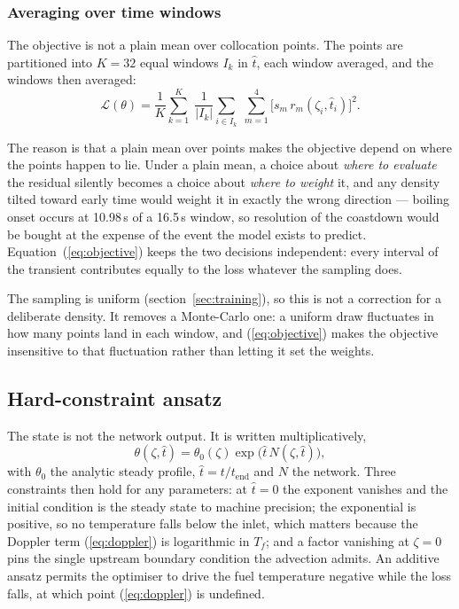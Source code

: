 \documentclass[11pt,a4paper]{article}
\begin{document}
\subsubsection{Averaging over time windows}

The objective is not a plain mean over collocation points. The points are partitioned into
$K = 32$ equal windows $I_k$ in $\hat{t}$, each window averaged, and the windows then
averaged:
\begin{equation}\label{eq:objective}
\mathcal{L}(\theta) = \frac{1}{K}\sum_{k=1}^{K}\;
  \frac{1}{|I_k|}\sum_{i \in I_k}\; \sum_{m=1}^{4}
  \bigl[s_m\,r_m(\zeta_i,\hat{t}_i)\bigr]^2 .
\end{equation}

The reason is that a plain mean over points makes the objective depend on where the points
happen to lie. Under a plain mean, a choice about \emph{where to evaluate} the residual
silently becomes a choice about \emph{where to weight} it, and any density tilted toward
early time would weight it in exactly the wrong direction --- boiling onset occurs at
10.98\,s of a 16.5\,s window, so resolution of the coastdown would be bought at the expense
of the event the model exists to predict. Equation~(\ref{eq:objective}) keeps the two
decisions independent: every interval of the transient contributes equally to the loss
whatever the sampling does.

The sampling is uniform (section~\ref{sec:training}), so this is not a correction for a
deliberate density. It removes a Monte-Carlo one: a uniform draw fluctuates in how many
points land in each window, and (\ref{eq:objective}) makes the objective insensitive to
that fluctuation rather than letting it set the weights.

\subsection{Hard-constraint ansatz}\label{sec:ansatz}

The state is not the network output. It is written multiplicatively,
\begin{equation}\label{eq:ansatz}
\theta(\zeta,\hat{t}) = \theta_0(\zeta)\exp\bigl(\hat{t}\,N(\zeta,\hat{t})\bigr),
\end{equation}
with $\theta_0$ the analytic steady profile, $\hat{t} = t/t_{\mathrm{end}}$ and $N$ the
network. Three constraints then hold for any parameters: at $\hat{t} = 0$ the exponent
vanishes and the initial condition is the steady state to machine precision; the
exponential is positive, so no temperature falls below the inlet, which matters because the
Doppler term (\ref{eq:doppler}) is logarithmic in $T_f$; and a factor vanishing at
$\zeta = 0$ pins the single upstream boundary condition the advection admits. An additive
ansatz permits the optimiser to drive the fuel temperature negative while the loss falls,
at which point (\ref{eq:doppler}) is undefined.
\end{document}
